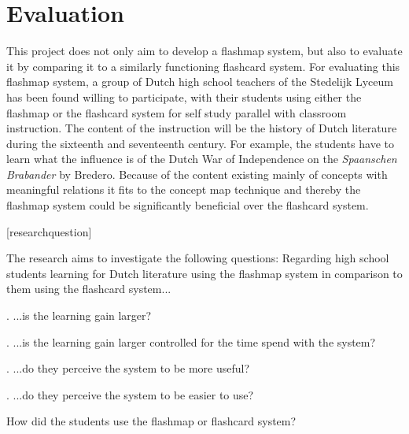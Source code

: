 \section{Evaluation}

\label{sec:intro_evaluation}

This project does not only aim to develop a flashmap system, but also to evaluate it by comparing it to a similarly functioning flashcard system. For evaluating this flashmap system, a group of Dutch high school teachers of the Stedelijk Lyceum has been found willing to participate, with their students using either the flashmap or the flashcard system for self study parallel with classroom instruction. The content of the instruction will be the history of Dutch literature during the sixteenth and seventeenth century. For example, the students have to learn what the influence is of the Dutch War of Independence on the \emph{Spaanschen Brabander} by Bredero. Because of the content existing mainly of concepts with meaningful relations it fits to the concept map technique and thereby the flashmap system could be significantly beneficial over the flashcard system.

\renewcommand{\theresearchquestion}{\Roman{researchquestion}}
[researchquestion]
\renewcommand{\thesubquestion}{\alph{subquestion}}

The research aims to investigate the following questions: Regarding high school students learning for Dutch literature using the flashmap system in comparison to them using the flashcard system...

\label{benefit}
\label{effectiveness}
. ...is the learning gain larger?

\label{efficiency}
. ...is the learning gain larger controlled for the time spend with the system?

\label{perception}
\label{usefulness}
. ...do they perceive the system to be more useful?

\label{ease}
. ...do they perceive the system to be easier to use?

\label{howused}
 How did the students use the flashmap or flashcard system?

